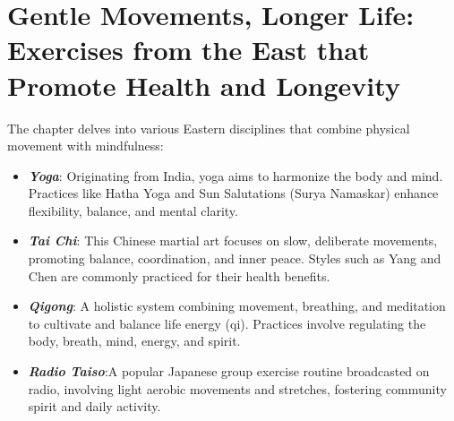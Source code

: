 \section*{Gentle Movements, Longer Life: Exercises from the East that Promote Health and Longevity}
The chapter delves into various Eastern disciplines that combine physical movement with mindfulness:
\begin{itemize}
    \item \textbf{\textit{Yoga}}: Originating from India, yoga aims to harmonize the body and mind. Practices like Hatha Yoga and Sun Salutations (Surya Namaskar) enhance flexibility, balance, and mental clarity.
    \item \textbf{\textit{Tai Chi}}: This Chinese martial art focuses on slow, deliberate movements, promoting balance, coordination, and inner peace. Styles such as Yang and Chen are commonly practiced for their health benefits.
    \item \textbf{\textit{Qigong}}: A holistic system combining movement, breathing, and meditation to cultivate and balance life energy (qi). Practices involve regulating the body, breath, mind, energy, and spirit.
    \item \textbf{\textit{Radio Taiso}}:A popular Japanese group exercise routine broadcasted on radio, involving light aerobic movements and stretches, fostering community spirit and daily activity.
\end{itemize}
